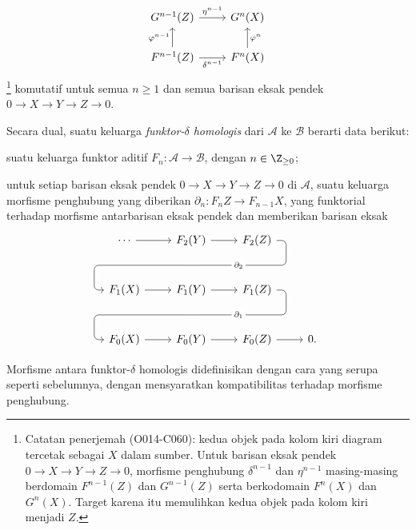 \begin{definisi}
\[\begin{tikzcd}
		G^{n-1} (Z) \arrow[r, "{\eta^{n-1}}"] & G^n (X) \\
		F^{n-1} (Z) \arrow[r, "{\delta^{n-1}}"'] \arrow[u, "{\varphi^{n-1}}"] & F^n (X) \arrow[u, "\varphi^n"']
	\end{tikzcd}\]
	\footnote{Catatan penerjemah (O014-C060): kedua objek pada kolom kiri diagram tercetak sebagai $X$ dalam sumber. Untuk barisan eksak pendek $0 \to X \to Y \to Z \to 0$, morfisme penghubung $\delta^{n-1}$ dan $\eta^{n-1}$ masing-masing berdomain $F^{n-1}(Z)$ dan $G^{n-1}(Z)$ serta berkodomain $F^n(X)$ dan $G^n(X)$. Target karena itu memulihkan kedua objek pada kolom kiri menjadi $Z$.}
	komutatif untuk semua $n \geq 1$ dan semua barisan eksak pendek $0 \to X \to Y \to Z \to 0$.
	
	Secara dual, suatu keluarga \emph{funktor-$\delta$ homologis} dari $\mathcal{A}$ ke $\mathcal{B}$ berarti data berikut:
	\begin{compactitem}
		\item suatu keluarga funktor aditif $F_n: \mathcal{A} \to \mathcal{B}$, dengan $n \in \Z_{\geq 0}$;
		\item untuk setiap barisan eksak pendek $0 \to X \to Y \to Z \to 0$ di $\mathcal{A}$, suatu keluarga morfisme penghubung yang diberikan $\partial_n: F_n Z \to F_{n-1} X$, yang funktorial terhadap morfisme antarbarisan eksak pendek dan memberikan barisan eksak
		\begin{equation*}\begin{tikzcd}[row sep=large]
			\cdots \arrow[r] & F_2(Y) \arrow[r] \arrow[phantom, d, ""{coordinate, name=A}] & F_2(Z) \arrow[dll, rounded corners, "{\partial_2}" description, to path={
				-- ([xshift=2ex]\tikztostart.east)
				|- (A) [near end]\tikztonodes
				-| ([xshift=-2ex]\tikztotarget.west)
				-- (\tikztotarget)}] & \\
			F_1(X) \arrow[r] & F_1(Y) \arrow[r] \arrow[phantom, d, ""{coordinate, name=B}] & F_1(Z) \arrow[dll, rounded corners, "{\partial_1}" description, to path={
				-- ([xshift=2ex]\tikztostart.east)
				|- (B) [near end]\tikztonodes
				-| ([xshift=-2ex]\tikztotarget.west)
				-- (\tikztotarget)}] & \\
			F_0 (X) \arrow[r] & F_0 (Y) \arrow[r] & F_0 (Z) \arrow[r] & 0.
		\end{tikzcd}\end{equation*}
	\end{compactitem}
	Morfisme antara funktor-$\delta$ homologis didefinisikan dengan cara yang serupa seperti sebelumnya, dengan mensyaratkan kompatibilitas terhadap morfisme penghubung.
\end{definisi}

